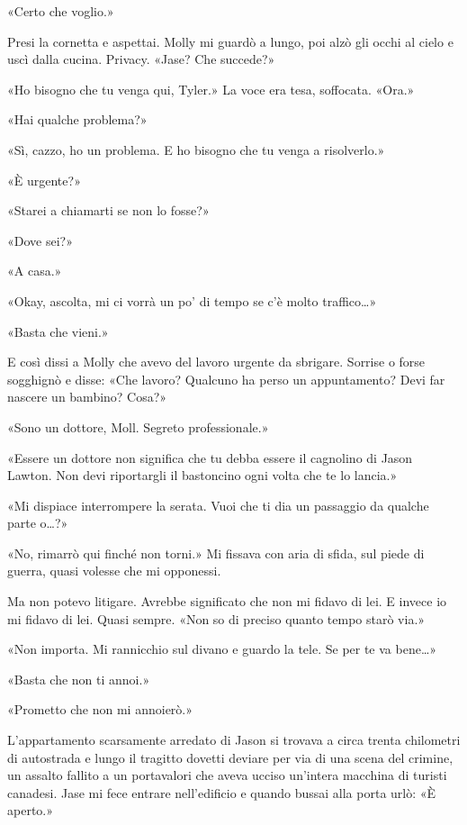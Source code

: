 «Certo che voglio.»

Presi la cornetta e aspettai. Molly mi guardò a lungo, poi alzò gli
occhi al cielo e uscì dalla cucina. Privacy. «Jase? Che succede?»

«Ho bisogno che tu venga qui, Tyler.» La voce era tesa, soffocata.
«Ora.»

«Hai qualche problema?»

«Sì, cazzo, ho un problema. E ho bisogno che tu venga a risolverlo.»

«È urgente?»

«Starei a chiamarti se non lo fosse?»

«Dove sei?»

«A casa.»

«Okay, ascolta, mi ci vorrà un po' di tempo se c'è molto traffico\ldots»

«Basta che vieni.»

E così dissi a Molly che avevo del lavoro urgente da sbrigare. Sorrise o
forse sogghignò e disse: «Che lavoro? Qualcuno ha perso un appuntamento?
Devi far nascere un bambino? Cosa?»

«Sono un dottore, Moll. Segreto professionale.»

«Essere un dottore non significa che tu debba essere il cagnolino di
Jason Lawton. Non devi riportargli il bastoncino ogni volta che te lo
lancia.»

«Mi dispiace interrompere la serata. Vuoi che ti dia un passaggio da
qualche parte o\ldots?»

«No, rimarrò qui finché non torni.» Mi fissava con aria di sfida, sul
piede di guerra, quasi volesse che mi opponessi.

Ma non potevo litigare. Avrebbe significato che non mi fidavo di lei. E
invece io mi fidavo di lei. Quasi sempre. «Non so di preciso quanto
tempo starò via.»

«Non importa. Mi rannicchio sul divano e guardo la tele. Se per te va
bene\ldots»

«Basta che non ti annoi.»

«Prometto che non mi annoierò.»

\separatorefiori

L'appartamento scarsamente arredato di Jason si trovava a circa trenta
chilometri di autostrada e lungo il tragitto dovetti deviare per via di
una scena del crimine, un assalto fallito a un portavalori che aveva
ucciso un'intera macchina di turisti canadesi. Jase mi fece entrare
nell'edificio e quando bussai alla porta urlò: «È aperto.»

